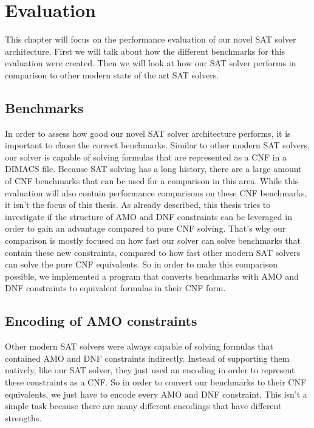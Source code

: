 
\chapter{Evaluation}
\label{ch:Evaluation}

This chapter will focus on the performance evaluation of our novel SAT solver architecture. First we will talk about how the different benchmarks for this evaluation were created. Then we will look at how our SAT solver performs in comparison to other modern state of the art SAT solvers.

\section{Benchmarks}

In order to assess how good our novel SAT solver architecture performs, it is important to chose the correct benchmarks. Similar to other modern SAT solvers, our solver is capable of solving formulas that are represented as a CNF in a DIMACS file. Because SAT solving has a long history, there are a large amount of CNF benchmarks that can be used for a comparison in this area. While this evaluation will also contain performance comparisons on these CNF benchmarks, it isn't the focus of this thesis. As already described, this thesis tries to investigate if the structure of AMO and DNF constraints can be leveraged in order to gain an advantage compared to pure CNF solving. That's why our comparison is mostly focused on how fast our solver can solve benchmarks that contain these new constraints, compared to how fast other modern SAT solvers can solve the pure CNF equivalents. So in order to make this comparison possible, we implemented a program that converts benchmarks with AMO and DNF constraints to equivalent formulas in their CNF form.

\section{Encoding of AMO constraints}

Other modern SAT solvers were always capable of solving formulas that contained AMO and DNF constraints indirectly. Instead of supporting them natively, like our SAT solver, they just used an encoding in order to represent these constraints as a CNF. So in order to convert our benchmarks to their CNF equivalents, we just have to encode every AMO and DNF constraint. This isn't a simple task because there are many different encodings that have different strengths.

